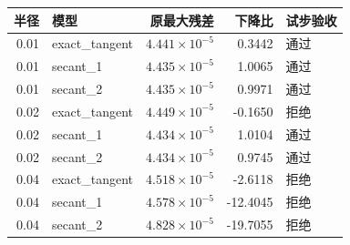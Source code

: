 \begin{tabular}{rlrrl}
\toprule
半径 & 模型 & 原最大残差 & 下降比 & 试步验收 \\
\midrule
0.01 & exact\_tangent & $4.441\times10^{-5}$ & 0.3442 & 通过 \\
0.01 & secant\_1 & $4.435\times10^{-5}$ & 1.0065 & 通过 \\
0.01 & secant\_2 & $4.435\times10^{-5}$ & 0.9971 & 通过 \\
0.02 & exact\_tangent & $4.449\times10^{-5}$ & -0.1650 & 拒绝 \\
0.02 & secant\_1 & $4.434\times10^{-5}$ & 1.0104 & 通过 \\
0.02 & secant\_2 & $4.434\times10^{-5}$ & 0.9745 & 通过 \\
0.04 & exact\_tangent & $4.518\times10^{-5}$ & -2.6118 & 拒绝 \\
0.04 & secant\_1 & $4.578\times10^{-5}$ & -12.4045 & 拒绝 \\
0.04 & secant\_2 & $4.828\times10^{-5}$ & -19.7055 & 拒绝 \\
\bottomrule
\end{tabular}
